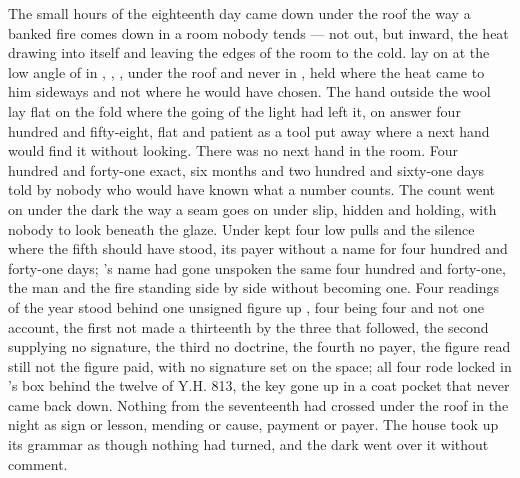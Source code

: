 
The small hours of the eighteenth day came down under the  roof the way a banked fire comes down in a room nobody tends --- not out, but inward, the heat drawing into itself and leaving the edges of the room to the cold.  lay on  at the low angle of  in , , , under the roof and never in , held where the heat came to him sideways and not where he would have chosen. The hand outside the wool lay flat on the fold where the going of the light had left it, on answer four hundred and fifty-eight, flat and patient as a tool put away where a next hand would find it without looking. There was no next hand in the room. Four hundred and forty-one exact, six months and two hundred and sixty-one days told by nobody who would have known what a number counts. The count went on under the dark the way a seam goes on under slip, hidden and holding, with nobody to look beneath the glaze. Under   kept four low pulls and the silence where the fifth should have stood, its payer without a name for four hundred and forty-one days; 's name had gone unspoken the same four hundred and forty-one, the man and the fire standing side by side without becoming one. Four readings of the year stood behind one unsigned figure up , four being four and not one account, the first not made a thirteenth by the three that followed, the second supplying no signature, the third no doctrine, the fourth no payer, the figure read still not the figure paid, with no signature set on the space; all four rode locked in 's box behind the twelve of Y.H. 813, the key gone up in a coat pocket that never came back down. Nothing from the seventeenth had crossed under the roof in the night as sign or lesson, mending or cause, payment or payer. The house took up its grammar as though nothing had turned, and the dark went over it without comment.

